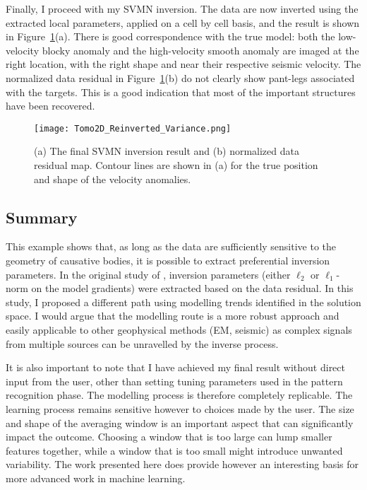 Finally, I proceed with my SVMN inversion. The data are now inverted using the extracted local parameters, applied on a cell by cell basis, and the result is shown in Figure~\ref{FinalMixedNorm}(a). There is good correspondence with the true model: both the low-velocity blocky anomaly and the high-velocity smooth anomaly are imaged at the right location, with the right shape and near their respective seismic velocity. The normalized data residual in Figure~\ref{FinalMixedNorm}(b) do not clearly show pant-legs associated with the targets. This is a good indication that most of the important structures have been recovered.
\begin{figure}
\texttt{[image: Tomo2D\_Reinverted\_Variance.png]}
\caption{(a) The final SVMN inversion result and (b) normalized data residual map. Contour lines are shown in (a) for the true position and shape of the velocity anomalies.}
\label{FinalMixedNorm}
\end{figure}

\subsection{Summary}
This example shows that, as long as the data are sufficiently sensitive to the geometry of causative bodies, it is possible to extract preferential inversion parameters. In the original study of \citet{SunLi14}, inversion parameters (either $\ell_2$ or $\ell_1$-norm on the model gradients) were extracted based on the data residual. In this study, I proposed a different path using modelling trends identified in the solution space. I would argue that the modelling route is a more robust approach and easily applicable to other geophysical methods (EM, seismic) as complex signals from multiple sources can be unravelled by the inverse process.

It is also important to note that I have achieved my final result without direct input from the user, other than setting tuning parameters used in the pattern recognition phase. The modelling process is therefore completely replicable. The learning process remains sensitive however to choices made by the user. The size and shape of the averaging window is an important aspect that can significantly impact the outcome. Choosing a window that is too large can lump smaller features together, while a window that is too small might introduce unwanted variability. The work presented here does provide however an interesting basis for more advanced work in machine learning.
